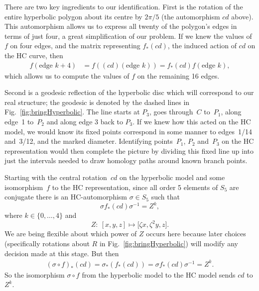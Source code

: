 \documentclass[pdftex]{sigma}
\numberwithin{equation}{section}
\begin{document}
There are two key ingredients to our identif\/ication. First is the rotation of the entire
hyperbolic polygon about its centre by $2\pi/5$ (the automorphism $cd$
above). This automorphism allows us to express all twenty of the
polygon's edges in terms of just four, a great simplif\/ication of our
problem. If we knew the values of $f$ on four edges, and the matrix
representing $f_*(cd)$, the induced action of $cd$ on the HC curve, then
\begin{align*}
  f(\text{edge } k+ 4) &= f\left((cd)(\text{edge } k)\right)
    =  f_*(cd) f(\text{edge } k),
\end{align*}
which allows us to compute the values of $f$ on the remaining 16
edges.

Second is a geodesic ref\/lection of the hyperbolic disc which will correspond to our real structure;
the geodesic is denoted by the
dashed lines in Fig.~\ref{fig:bringHyperbolic}. The line starts at $P_3$,
goes through~$C$ to~$P_1$, along edge~1 to~$P_2$ and along edge 3 back
to $P_3$. If we knew how this acted on the HC model, we would know
its f\/ixed points correspond in some manner to edges~1/14 and~3/12, and
the marked diameter.
Identifying points~$P_1$, $P_2$ and~$P_3$ on the HC representation
would then complete the picture by dividing this f\/ixed line up into
just the intervals needed to draw homology paths around known branch
points.

Starting with the central rotation~$cd$ on the hyperbolic
model and some isomorphism~$f$ to the HC representation, since all
order 5 elements of $S_5$ are conjugate there is an HC-automorphism
${\sigma}\in S_5$ such that
\[
  {\sigma} f_*(cd) {\sigma}^{-1} = Z^k,
\]
where $k\in\{0,\dots,4\}$ and
\[ Z : \ [x,y,z] \mapsto \big[\zeta x, \zeta^2 y, z\big]. \]
We are being f\/lexible about which power of $Z$ occurs here because
later choices (specif\/ically rotations about $R$ in Fig.~\ref{fig:bringHyperbolic}) will modify any decision made at
this stage. But then
\begin{gather*}
  (\sigma\circ f)_*(cd)  = \sigma_*(f_*(cd))
    = \sigma f_*(cd) \sigma^{-1}
    = Z^k.
\end{gather*}
So the isomorphism $\sigma\circ f$ from the hyperbolic model to
the HC model sends $cd$ to $Z^k$.
\end{document}
